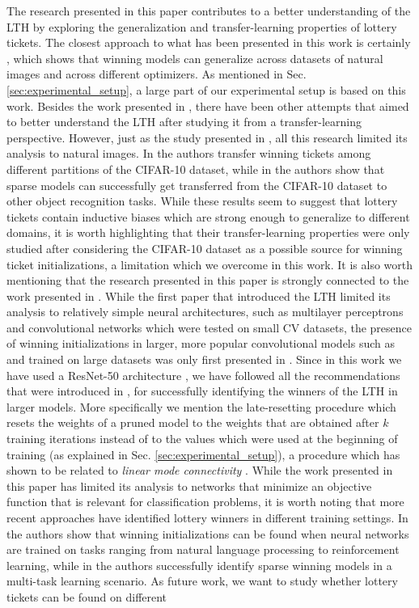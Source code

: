 The research presented in this paper contributes to a better understanding of the LTH by exploring the generalization and transfer-learning properties of lottery tickets. The closest approach to what has been presented in this work is certainly \cite{morcos2019one}, which shows that winning models can generalize across datasets of natural images and across different optimizers. As mentioned in Sec. \ref{sec:experimental_setup}, a large part of our experimental setup is based on this work. Besides the work presented in \cite{morcos2019one}, there have been other attempts that aimed to better understand the LTH after studying it from a transfer-learning perspective. However, just as the study presented in \cite{morcos2019one}, all this research limited its analysis to natural images. In \cite{van2019using} the authors transfer winning tickets among different partitions of the CIFAR-10 dataset, while in \cite{mehta2019sparse} the authors show that sparse models can successfully get transferred from the CIFAR-10 dataset to other object recognition tasks. While these results seem to suggest that lottery tickets contain inductive biases which are strong enough to generalize to different domains, it is worth highlighting that their transfer-learning properties were only studied after considering the CIFAR-10 dataset as a possible source for winning ticket initializations, a limitation which we overcome in this work. It is also worth mentioning that the research presented in this paper is strongly connected to the work presented in \cite{franklestabilizing}. While the first paper that introduced the LTH limited its analysis to relatively simple neural architectures, such as multilayer perceptrons and convolutional networks which were tested on small CV datasets, the presence of winning initializations in larger, more popular convolutional models such as \cite{szegedy2015going} and \cite{he2016deep} trained on large datasets \cite{russakovsky2015imagenet} was only first presented in \cite{franklestabilizing}. Since in this work we have used a ResNet-50 architecture \cite{he2016deep}, we have followed all the recommendations that were introduced in \cite{franklestabilizing}, for successfully identifying the winners of the LTH in larger models. More specifically we mention the late-resetting procedure which resets the weights of a pruned model to the weights that are obtained after $k$ training iterations instead of to the values which were used at the beginning of training (as explained in Sec. \ref{sec:experimental_setup}), a procedure which has shown to be related to \textit{linear mode connectivity} \cite{frankle2019linear}. While the work presented in this paper has limited its analysis to networks that minimize an objective function that is relevant for classification problems, it is worth noting that more recent approaches have identified lottery winners in different training settings. In \cite{yu2019playing} the authors show that winning initializations can be found when neural networks are trained on tasks ranging from natural language processing to reinforcement learning, while in \cite{sun2019learning} the authors successfully identify sparse winning models in a multi-task learning scenario. As future work, we want to study whether lottery tickets can be found on different 